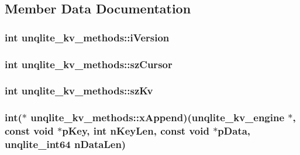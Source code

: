 \subsection{Member Data Documentation}
\hypertarget{structunqlite__kv__methods_ade29e7aa5bb2555ce02504e547a5c894}{
\subsubsection[{i\-Version}]{\setlength{\rightskip}{0pt plus 5cm}int unqlite\-\_\-kv\-\_\-methods\-::i\-Version}}\label{d2/dfb/structunqlite__kv__methods_ade29e7aa5bb2555ce02504e547a5c894}
\hypertarget{structunqlite__kv__methods_a1f661a27a021c83452bd5a5c7984f4a5}{
\subsubsection[{sz\-Cursor}]{\setlength{\rightskip}{0pt plus 5cm}int unqlite\-\_\-kv\-\_\-methods\-::sz\-Cursor}}\label{d2/dfb/structunqlite__kv__methods_a1f661a27a021c83452bd5a5c7984f4a5}
\hypertarget{structunqlite__kv__methods_a7ce3bc1bb75d2b89b33c6e2ba21e9b78}{
\subsubsection[{sz\-Kv}]{\setlength{\rightskip}{0pt plus 5cm}int unqlite\-\_\-kv\-\_\-methods\-::sz\-Kv}}\label{d2/dfb/structunqlite__kv__methods_a7ce3bc1bb75d2b89b33c6e2ba21e9b78}
\hypertarget{structunqlite__kv__methods_a84b482400e3dee633d777cca654b6aec}{
\subsubsection[{x\-Append}]{\setlength{\rightskip}{0pt plus 5cm}int($\ast$ unqlite\-\_\-kv\-\_\-methods\-::x\-Append)({\bf unqlite\-\_\-kv\-\_\-engine} $\ast$, const void $\ast$p\-Key, int n\-Key\-Len, const void $\ast$p\-Data, {\bf unqlite\-\_\-int64} n\-Data\-Len)}}\label{d2/dfb/structunqlite__kv__methods_a84b482400e3dee633d777cca654b6aec}
